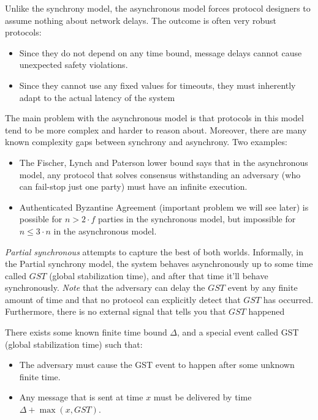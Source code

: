 Unlike the synchrony model, 
the asynchronous model forces protocol designers to assume nothing about network delays.
The outcome is often very robust protocols:

\begin{itemize}
    \item Since they do not depend on any time bound, message delays 
    cannot cause unexpected safety violations.
    \item Since they cannot use any fixed values for timeouts, 
    they must inherently adapt to the actual latency of the system
\end{itemize}

The main problem with the asynchronous model is that protocols in this model tend to be more
complex and harder to reason about. 
Moreover, there are many known complexity gaps between synchrony and asynchrony. Two examples:

\begin{itemize}
    \item The Fischer, Lynch and Paterson \cite[FLP, 1985]{flp} lower bound says 
    that in the asynchronous model, any protocol that solves consensus 
    withstanding an adversary (who can fail-stop just one party) must have an infinite execution.
    \item Authenticated Byzantine Agreement (important problem we will see later) is possible for 
    $n>2\cdot f$ parties in the synchronous model, but impossible for $n \le3\cdot n$ in the asynchronous model.
\end{itemize}




\emph{Partial synchronous} attempts to capture the best of both worlds.
Informally, in the Partial synchrony model, the system behaves asynchronously 
up to some time called $GST$ (global stabilization time), and after that time it'll behave synchronously.
\emph{Note} that the adversary can delay the $GST$ event by any finite amount
of time and that no protocol can explicitly detect that $GST$ has occurred.
Furthermore, there is no external signal that tells you that $GST$ happened

\begin{defn}
    There exists some known finite time bound $\Delta$,
    and a special event called GST (global stabilization time) such that:
    \begin{itemize}
        \item The adversary must cause the GST event to happen after 
        some unknown finite time.
        \item Any message that is sent at time $x$ must be delivered by 
        time $\Delta+\max\left(x,GST\right)$.
    \end{itemize}
\end{defn}

